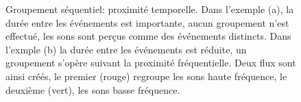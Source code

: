 \begin{figure}[t]
        \myfloatalign
        \caption[Groupement séquentiel : proximité temporelle.]{Groupement séquentiel: proximité temporelle. Dans l'exemple (a), la durée entre les événements est importante, aucun groupement n'est effectué, les sons sont perçus comme des événements distincts. Dans l'exmple (b) la durée entre les événements est réduite, un groupement s'opère suivant la proximité fréquentielle. Deux flux sont ainsi créés, le premier (rouge) regroupe les sons haute fréquence, le deuxième (vert), les sons basse fréquence.}\label{fig:tonesim}
\end{figure}

